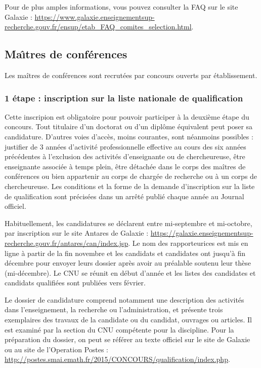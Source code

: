 Pour de plus amples informations, vous pouvez consulter la FAQ sur le site Galaxie : \url{https://www.galaxie.enseignementsup-recherche.gouv.fr/ensup/etab_FAQ_comites_selection.html}.

\subsection{Ma\^\i tres de conf\'erences}

Les ma\^itres de conf\'erences sont recrut\'e\mp e\mp s par concours ouverts par \'etablissement.

\subsubsection*{1\iere{} \'etape : inscription sur la liste nationale de qualification}

Cette inscripion est obligatoire pour pouvoir participer \`a la
deuxi\`eme \'etape du concours. Tout titulaire d'un doctorat ou d'un
dipl\^ome \'equivalent peut poser sa candidature. D'autres voies
d'acc\`es, moins courantes, sont n\'eanmoins possibles : justifier de
3 ann\'ees d'activit\'e professionnelle effective au cours des six
ann\'ees pr\'ec\'edentes \`a l'exclusion des activit\'es
d'enseignant\mp e ou de chercheur\mp euse, \^etre enseignant\mp e associ\'e\mp e \`a temps
plein, \^etre d\'etach\'e\mp e dans le corps des ma\^itres de
conf\'erences ou bien appartenir au corps de charg\'e\mp e de recherche
ou \`a un corps de chercheur\mp euse. Les conditions et la forme de la
demande d'inscription sur la liste de qualification sont
pr\'ecis\'ees dans un arr\^et\'e publi\'e chaque ann\'ee au Journal
officiel.

Habituellement, les candidatures se d\'eclarent entre mi-septembre et mi-octobre, 
par inscription sur le site Antares de Galaxie : \url{https://galaxie.enseignementsup-recherche.gouv.fr/antares/can/index.jsp}.
Le nom des rapporteur\mp ice\mp s est mis en ligne \`a partir de la fin novembre et 
les candidats et candidates ont jusqu'\`a fin d\'ecembre pour envoyer leurs dossier apr\`es avoir au pr\'ealable soutenu
leur th\`ese (mi-d\'ecembre).
Le CNU se r\'eunit en d\'ebut d'ann\'ee et les listes des candidates et candidats qualifi\'e\mp e\mp s sont publi\'ees vers f\'evrier.

Le dossier de candidature comprend notamment une
description des activit\'es dans l'enseignement, la recherche ou
l'administration, et pr\'esente trois exemplaires des travaux de la candidate ou du candidat,
ouvrages ou articles. Il est examin\'e par la section du CNU
comp\'etente pour la discipline. Pour la pr\'eparation du dossier, on peut se r\'ef\'erer au texte officiel sur le site de Galaxie
ou au site de l'Operation Postes : \url{http://postes.smai.emath.fr/2015/CONCOURS/qualification/index.php}.

